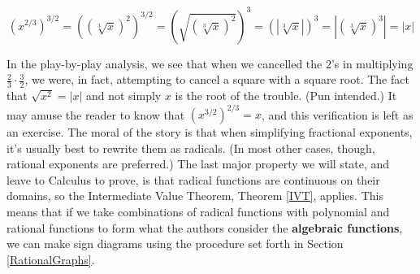 \[ \left(x^{2/3}\right)^{3/2} = \left(\left(\sqrt[3]{x}\right)^2\right)^{3/2} =  \left(\sqrt{\left(\sqrt[3]{x}\right)^2}\right)^3 =\left(\left|\sqrt[3]{x}\right|\right)^3 = \left| \left(\sqrt[3]{x}\right)^3  \right| = |x|\]

In the play-by-play analysis, we see that when we cancelled the $2$'s in multiplying $\frac{2}{3} \cdot \frac{3}{2}$, we were, in fact, attempting to cancel a square with a square root.  The fact that $\sqrt{x^2} = |x|$ and not simply $x$ is the root of the trouble. (Pun intended.)  It may amuse the reader to know that  $\left(x^{3/2}\right)^{2/3} = x$, and this verification is left as an exercise.  The moral of the story is that when simplifying fractional exponents, it's usually best to rewrite them as radicals. (In most other cases, though, rational exponents are preferred.)   The last major property we will state, and leave to Calculus to prove, is that radical functions are continuous on their domains, so the Intermediate Value Theorem, Theorem \ref{IVT}, applies.  This means that if we take combinations of radical functions with polynomial and rational functions to form what the authors consider  the \textbf{algebraic functions}, we can make sign diagrams using the procedure set forth in Section \ref{RationalGraphs}.  


\medskip


